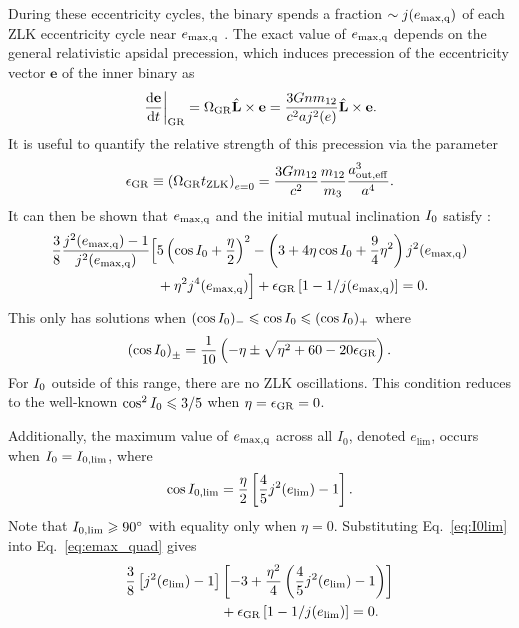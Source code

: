\documentclass[
        fleqn,
        usenatbib,
    ]{mnras}
\newcommand*{\rd}[2]{\frac{\mathrm{d}#1}{\mathrm{d}#2}}
\newcommand*{\at}[1]{\left.#1\right|}
\newcommand*{\p}[1]{\left(#1\right)}
\newcommand*{\s}[1]{\left[#1\right]}
\newcommand*{\bm}[1]{\mathbf{#1}}
\newcommand*{\uv}[1]{\hat{\mathbf{#1}}}
\begin{document}
During these eccentricity cycles, the binary spends a fraction $\sim
j(e_{\rm \max, q})$ of each ZLK eccentricity cycle near $e_{\rm \max, q}$
\citep{anderson2016formation}. The exact value of $e_{\rm \max, q}$ depends on the
general relativistic apsidal precession, which induces precession of the
eccentricity vector $\bm{e}$ of the inner binary as
\begin{equation}
    \at{\rd{\bm{e}}{t}}_{\rm GR} = \Omega_{\rm GR}\uv{L} \times \bm{e}
        = \frac{3Gnm_{12}}{c^2aj^2(e)}\uv{L} \times \bm{e}.
\end{equation}
It is useful to quantify the relative strength of this precession via the
parameter
\begin{equation}
    \epsilon_{\rm GR} \equiv \p{\Omega_{\rm GR} t_{\rm ZLK}}_{e = 0}
        = \frac{3Gm_{12}}{c^2} \frac{m_{12}}{m_3}\frac{a_{\rm out, eff}^3}{a^4}.
\end{equation}
It can then be shown that $e_{\rm \max, q}$ and the initial mutual inclination $I_{\rm
0}$ satisfy \citep{LML15, anderson2016formation}:
\begin{align}
    \frac{3}{8}\frac{j^2(e_{\rm \max, q}) - 1}{j^2(e_{\rm \max, q})}\Big[&
        5\p{\cos I_0 + \frac{\eta}{2}}^2
        - \p{3 + 4\eta \cos I_0 + \frac{9}{4}\eta^2}j^2(e_{\rm \max, q})
            \nonumber\\
        &+ \eta^2 j^4(e_{\rm \max, q})
    \Big] + \epsilon_{\rm GR}\s{1 - 1 / j(e_{\rm \max, q})} = 0.\label{eq:emax_quad}
\end{align}
This only has solutions when $(\cos I_{\rm 0})_- \leq \cos I_{\rm 0} \leq (\cos
I_{\rm 0})_+$ where
\begin{equation}
    \p{\cos I_{\rm 0}}_{\pm} = \frac{1}{10}\p{-\eta \pm \sqrt{\eta^2 + 60 -
        20\epsilon_{\rm GR}}}.\label{eq:I0bounds}
\end{equation}
For $I_{\rm 0}$ outside of this range, there are no ZLK oscillations. This
condition reduces to the well-known $\cos^2 I_{\rm 0} \leq 3/5$ when $\eta =
\epsilon_{\rm GR} = 0$.

Additionally, the maximum value of $e_{\rm \max, q}$ across all $I_0$, denoted
$e_{\lim}$, occurs when $I_{\rm 0} = I_{\rm 0, \lim}$, where
\begin{equation}
    \cos I_{\rm 0, \lim} = \frac{\eta}{2}\s{\frac{4}{5}j^2(e_{\lim}) -
        1}.\label{eq:I0lim}
\end{equation}
Note that $I_{\rm 0, \lim} \geq 90^\circ$ with equality only when $\eta
= 0$. Substituting Eq.~\eqref{eq:I0lim} into Eq.~\eqref{eq:emax_quad}
gives
\begin{align}
    \frac{3}{8}\s{j^2(e_{\lim}) - 1}&\s{-3 + \frac{\eta^2}{4}
        \p{\frac{4}{5}j^2(e_{\lim}) - 1}}\nonumber\\
        &+ \epsilon_{\rm GR}\s{1 - 1 / j(e_{\lim})} = 0.
        \label{eq:def_elim}
\end{align}
\end{document}
